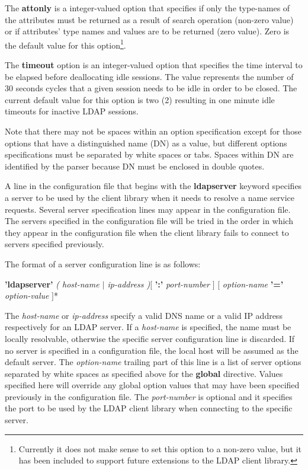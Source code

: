 The {\bf attonly} is a integer-valued option that specifies if only
the type-names of the attributes must be returned as a result of
search operation (non-zero value) or if attributes' type names and
values are to be returned (zero value). Zero is the default
value for this option\footnote{Currently it does not make sense to set
this option to a non-zero value, but it has been included to support 
future extensions to the LDAP client library.}.

The {\bf timeout} option is an integer-valued option that specifies 
the time interval to be elapsed before deallocating idle sessions. The
value represents the number of 30 seconds cycles that a given session
needs to be idle in order to be closed. The current default value for
this option is two (2) resulting in one minute idle timeouts for
inactive LDAP sessions.

Note that there may not be spaces within an option specification
except for those options that have a distinguished name (DN) as a value, but
different options specifications must be separated by white spaces or 
tabs. Spaces within DN are identified by the parser because DN must be
enclosed in double quotes.

A line in the configuration file that begins with the {\bf ldapserver}
keyword specifies a server to be used by the client library when it
needs to resolve a name service requests. Several server specification
lines may appear in the configuration file. The servers specified in the
configuration file will be tried in the order in which they appear in
the configuration file when the client library fails to connect to
servers specified previously.

The format of a server configuration line is as follows:

\begin{center}
{\bf 'ldapserver'} {\em ( host-name $|$ ip-address )}$[$ {\bf ':'} {\em
port-number} $]$ $[$ {\em option-name} {\bf '='} {\em option-value} $]$*
\end{center}		

The {\em host-name} or {\em ip-address} specify a valid DNS name or a
valid IP address respectively for an LDAP server. If a {\em host-name} is
specified, the name must be locally resolvable, otherwise the specific
server configuration line is discarded.
If no server is specified in a configuration file, the local host will
be assumed as the default server. The {\em option-name} trailing part
of this line is a list of server options separated by white spaces as
specified above for the {\bf global} directive. Values specified here
will override any global option values that may have been specified
previously in the configuration file. 
The {\em port-number} is optional and it specifies the port to be used
by the LDAP client library when connecting to the specific server.

